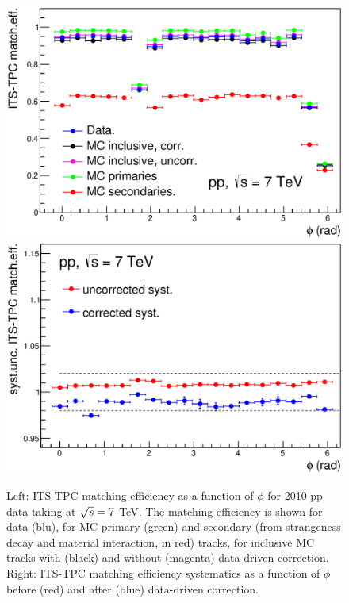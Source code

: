 \begin{figure}[!htb]
\begin{center}
\includegraphics[width=.49\textwidth]{FigCap4/ITSTPCmatchEff_10bpass4_vsPhi.eps}
\includegraphics[width=.49\textwidth]{FigCap4/ITSTPCmatchEffSyst_10bpass4_vsPhi.eps}
\caption{Left: ITS-TPC matching efficiency as a function of $\phi$ for 2010 pp data taking at $\sqrt{s} = 7$ TeV. The matching efficiency is shown for data (blu), for MC primary (green) and secondary (from strangeness decay and material interaction, in red) tracks, for inclusive MC tracks with (black) and without (magenta) data-driven correction. Right: ITS-TPC matching efficiency systematics as a function of $\phi$ before (red) and after (blue) data-driven correction.}
\label{fig:CorrMatchEffVsPhi}
\end{center}
\end{figure}


